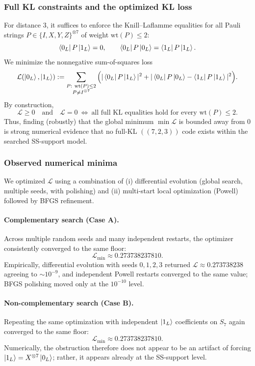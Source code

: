 \documentclass[11pt]{article}
\begin{document}
\subsubsection{Full KL constraints and the optimized KL loss}
For distance \(3\), it suffices to enforce the Knill--Laflamme equalities for all Pauli strings
\(P\in\{I,X,Y,Z\}^{\otimes 7}\) of weight \(\mathrm{wt}(P)\le 2\):
\[
\bra{0_L}P\ket{1_L}=0,
\qquad
\bra{0_L}P\ket{0_L}=\bra{1_L}P\ket{1_L}.
\]
We minimize the nonnegative sum-of-squares loss
\[
\mathcal{L}(\ket{0_L},\ket{1_L})
:=\sum_{\substack{P:\ \mathrm{wt}(P)\le 2\\P\neq I^{\otimes 7}}}
\Big(
|\bra{0_L}P\ket{1_L}|^2
+
|\bra{0_L}P\ket{0_L}-\bra{1_L}P\ket{1_L}|^2
\Big).
\]
By construction,
\[
\mathcal{L}\ge 0
\quad\text{and}\quad
\mathcal{L}=0\ \Longleftrightarrow\ \text{all full KL equalities hold for every }\mathrm{wt}(P)\le 2.
\]
Thus, finding (robustly) that the global minimum \(\min\mathcal{L}\) is bounded away from \(0\) is strong numerical evidence
that no full-KL \(((7,2,3))\) code exists within the searched SS-support model.

\subsubsection{Observed numerical minima}
We optimized \(\mathcal{L}\) using a combination of (i) differential evolution (global search, multiple seeds, with polishing) and
(ii) multi-start local optimization (Powell) followed by BFGS refinement.

\paragraph{Complementary search (Case A).}
Across multiple random seeds and many independent restarts, the optimizer consistently converged to the same floor:
\[
\boxed{\mathcal{L}_{\min}\approx 0.273738237810.}
\]
Empirically, differential evolution with seeds \(0,1,2,3\) returned \(\mathcal{L}\approx 0.273738238\) agreeing to \(\sim 10^{-9}\),
and independent Powell restarts converged to the same value; BFGS polishing moved only at the \(10^{-10}\) level.

\paragraph{Non-complementary search (Case B).}
Repeating the same optimization with independent \(\ket{1_L}\) coefficients on \(S_7\) again converged to the same floor:
\[
\boxed{\mathcal{L}_{\min}\approx 0.273738237810.}
\]
Numerically, the obstruction therefore does not appear to be an artifact of forcing \(\ket{1_L}=X^{\otimes 7}\ket{0_L}\);
rather, it appears already at the SS-support level.
\end{document}
